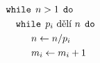 \documentclass[preview]{standalone}
\begin{document}
\begin{align*}
\mathtt{while}& \:\: n > 1 \:\: \mathtt{do}\\&\hspace*{-16pt}\mathtt{while} \:\: p_i \text{ dělí } n \:\: \mathtt{do}\\&n \leftarrow n / p_i\\&m_i \leftarrow m_i + 1
\end{align*}
\end{document}
